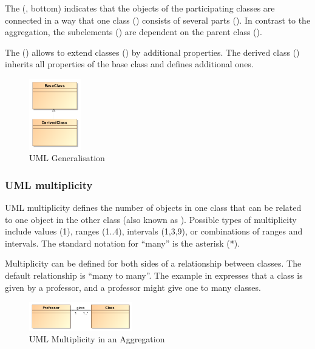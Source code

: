The  (, bottom) indicates that the objects of the participating classes are connected in a way that one class () consists of several parts (). In contrast to the aggregation, the subelements () are dependent on the parent class ().


The  () allows to extend classes () by additional properties. The derived class () inherits all properties of the base class and defines additional ones.

\begin{figure}[h]
	\centering
	\includegraphics[width=0.2\textwidth]{images/pdf/umlGeneralisation}
	\caption{UML Generalisation}
	\label{fig:umlGeneralisation}
\end{figure}


\subsubsection{UML multiplicity}
UML multiplicity defines the number of objects in one class that can be related to one object in the other class (also known as ). Possible types of multiplicity include values (1), ranges (1$..$4), intervals (1,3,9), or combinations of ranges and intervals. The standard notation for ``many'' is the asterisk (*). 

Multiplicity can be defined for both sides of a relationship between classes. The default relationship is ``many to many''. The example in  expresses that a class is given by a professor, and a professor might give one to many classes.

\begin{figure}[h]
	\centering
	\includegraphics[width=0.4\textwidth]{images/pdf/umlMultiplicity}
	\caption{UML Multiplicity in an Aggregation}
	\label{fig:umlMulti}
\end{figure}


